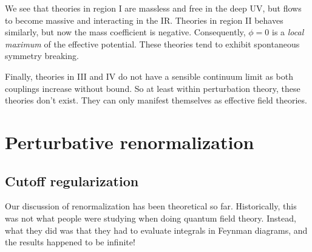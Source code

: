 \documentclass[a4paper]{article}
\begin{document}
\begin{center}
\end{center}
We see that theories in region I are massless and free in the deep UV, but flows to become massive and interacting in the IR. Theories in region II behaves similarly, but now the mass coefficient is negative. Consequently, $\phi = 0$ is a \emph{local maximum} of the effective potential. These theories tend to exhibit spontaneous symmetry breaking.

Finally, theories in III and IV do not have a sensible continuum limit as both couplings increase without bound. So at least within perturbation theory, these theories don't exist. They can only manifest themselves as effective field theories.

\section{Perturbative renormalization}
\subsection{Cutoff regularization}
Our discussion of renormalization has been theoretical so far. Historically, this was not what people were studying when doing quantum field theory. Instead, what they did was that they had to evaluate integrals in Feynman diagrams, and the results happened to be infinite!
\end{document}
